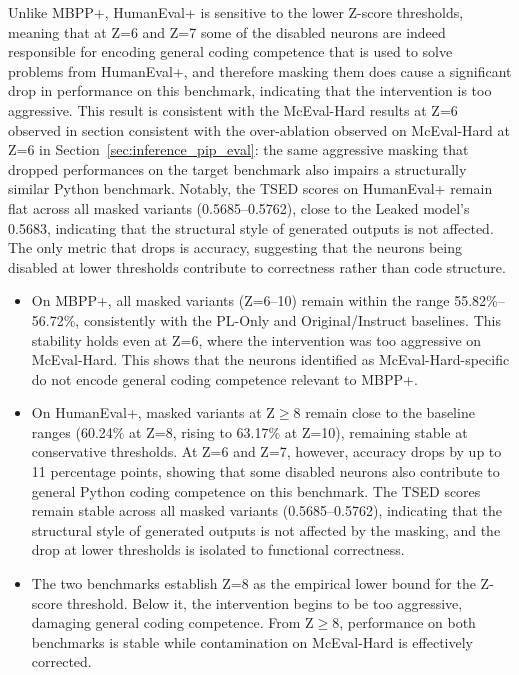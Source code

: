 \documentclass[mscthesis]{usiinfthesis}
\begin{document}
Unlike MBPP+, HumanEval+ is sensitive to the lower Z-score thresholds, meaning that at Z=6 and Z=7 some of the disabled neurons are indeed responsible for encoding general coding competence that is used to solve problems from HumanEval+, and therefore masking them does cause a significant drop in performance on this benchmark, indicating that the intervention is too aggressive.
This result is consistent with the McEval-Hard results at Z=6 observed in section
consistent with the over-ablation observed on McEval-Hard at Z=6 in Section~\ref{sec:inference_pip_eval}: the same aggressive masking that dropped
performances on the target benchmark also impairs a structurally similar Python
benchmark. 
Notably, the TSED scores on HumanEval+ remain flat across all masked
variants (0.5685--0.5762), close to the Leaked model's 0.5683, indicating that the
structural style of generated outputs is not affected.
The only metric that drops is accuracy, suggesting that the neurons being disabled at lower thresholds contribute to correctness rather than code structure.


\begin{tcolorbox}[
  colback=blue!5!white,
  colframe=blue!40!black,
  title=\textbf{Findings — Robustness Evaluation},
  fonttitle=\bfseries,
  rounded corners,
  arc=4pt
]
\begin{itemize}
  \item On MBPP+, all masked variants (Z=6--10) remain within the range
  55.82\%--56.72\%, consistently with the PL-Only and Original/Instruct baselines.
  This stability holds even at Z=6, where the intervention was too aggressive on McEval-Hard.
  This shows that the neurons identified as McEval-Hard-specific do not encode general coding competence
  relevant to MBPP+.

  \item On HumanEval+, masked variants at Z$\geq$8 remain close to the baseline ranges (60.24\% at Z=8, rising to 63.17\% at Z=10), remaining
  stable at conservative thresholds. At Z=6 and Z=7, however,
  accuracy drops by up to 11 percentage points, showing that some disabled neurons also
  contribute to general Python coding competence on this benchmark.
  The TSED scores remain stable across all masked variants (0.5685--0.5762), indicating that
  the structural style of generated outputs is not affected by the masking, and the drop at
  lower thresholds is isolated to functional correctness.

  \item The two benchmarks establish Z=8 as the empirical lower bound
  for the Z-score threshold.
  Below it, the intervention begins to be too aggressive, damaging general coding competence.
  From Z$\geq$8, performance on both benchmarks is stable while contamination on McEval-Hard is effectively corrected.
\end{itemize}
\end{tcolorbox}
\end{document}
